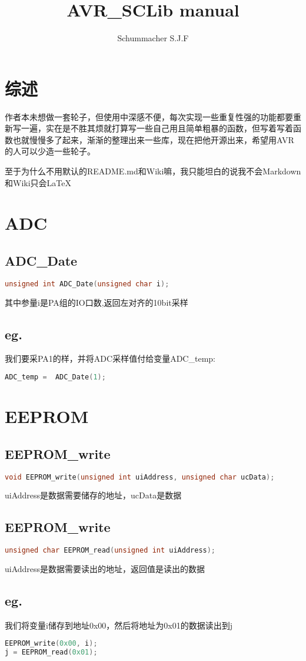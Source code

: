 \documentclass{paper}
\title{AVR\_SCLib manual}
\begin{document}
\author{Schummacher S.J.F}
\maketitle
\newpage
\tableofcontents
\newpage
\section{综述}
作者本未想做一套轮子，但使用中深感不便，每次实现一些重复性强的功能都要重新写一遍，实在是不胜其烦就打算写一些自己用且简单粗暴的函数，但写着写着函数也就慢慢多了起来，渐渐的整理出来一些库，现在把他开源出来，希望用AVR的人可以少造一些轮子。\par
至于为什么不用默认的README.md和Wiki嘛，我只能坦白的说我不会Markdown和Wiki只会\LaTeX
\section{ADC}
\subsection{ADC\_Date}
\begin{lstlisting}[language=C]
unsigned int ADC_Date(unsigned char i);
\end{lstlisting}
其中参量i是PA组的IO口数,返回左对齐的10bit采样
\subsection{eg.}
我们要采PA1的样，并将ADC采样值付给变量ADC\_temp:
\begin{lstlisting}[language=C]
ADC_temp =  ADC_Date(1);
\end{lstlisting}
\section{EEPROM}
\subsection{EEPROM\_write}
\begin{lstlisting}[language=C]
void EEPROM_write(unsigned int uiAddress, unsigned char ucData);
\end{lstlisting}
uiAddress是数据需要储存的地址，ucData是数据
\subsection{EEPROM\_write}
\begin{lstlisting}[language=C]
unsigned char EEPROM_read(unsigned int uiAddress);
\end{lstlisting}
uiAddress是数据需要读出的地址，返回值是读出的数据
\subsection{eg.}
我们将变量i储存到地址0x00，然后将地址为0x01的数据读出到j
\begin{lstlisting}[language=C]
EEPROM_write(0x00, i);
j = EEPROM_read(0x01);
\end{lstlisting}
\end{document}
